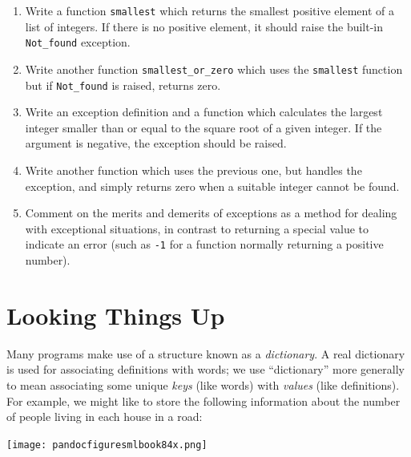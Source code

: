 \documentclass[]{book}
\begin{document}
\begin{enumerate}
\item Write a function \texttt{smallest} which returns the smallest positive element of a list of integers. If there is no positive element, it should raise the built-in \texttt{Not\_found} exception.

\item Write another function \texttt{smallest\_or\_zero} which uses the \texttt{smallest} function but if \texttt{Not\_found} is raised, returns zero.

\item Write an exception definition and a function which calculates the largest integer smaller than or equal to the square root of a given integer. If the argument is negative, the exception should be raised.

\item Write another function which uses the previous one, but handles the exception, and simply returns zero when a suitable integer cannot be found.

\item Comment on the merits and demerits of exceptions as a method for dealing with exceptional situations, in contrast to returning a special value to indicate an error (such as \texttt{-1} for a function normally returning a positive number).

\end{enumerate}

\cleardoublepage
\thispagestyle{empty}


\pagestyle{empty}


\chapter{Looking Things Up}
\pagestyle{fancy}

Many programs make use of a structure known as a \textit{dictionary}. A real dictionary is used for associating definitions with words; we use ``dictionary'' more generally to mean associating some unique \textit{keys} (like words) with \textit{values} (like definitions). For example, we might like to store the following information about the number of people living in each house in a road:

\medskip
\begin{center}
\noindent\texttt{[image: pandocfiguresmlbook84x.png]}
\end{center}
\medskip
\end{document}
